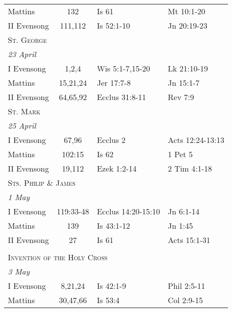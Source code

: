 \begin{longtable}{l c l l}
\hspace{1em} Mattins&132&Is 61&Mt 10:1-20\\
\hspace{1em} II Evensong&111,112&Is 52:1-10&Jn 20:19-23\\
\multicolumn{4}{l}{\textsc{St. George}}\\
\multicolumn{4}{l}{\textit{23 April}}\\
\hspace{1em} I Evensong&1,2,4&Wis 5:1-7,15-20&Lk 21:10-19\\
\hspace{1em} Mattins&15,21,24&Jer 17:7-8&Jn 15:1-7\\
\hspace{1em} II Evensong&64,65,92&Ecclus 31:8-11&Rev 7:9\\
\multicolumn{4}{l}{\textsc{St. Mark}}\\
\multicolumn{4}{l}{\textit{25 April}}\\
\hspace{1em} I Evensong&67,96&Ecclus 2&Acts 12:24-13:13\\
\hspace{1em} Mattins&102:15&Is 62&1 Pet 5\\
\hspace{1em} II Evensong&19,112&Ezek 1:2-14&2 Tim 4:1-18\\
\multicolumn{4}{l}{\textsc{Sts. Philip \& James}}\\
\multicolumn{4}{l}{\textit{1 May}}\\
\hspace{1em} I Evensong&119:33-48&Ecclus 14:20-15:10&Jn 6:1-14\\
\hspace{1em} Mattins&139&Is 43:1-12&Jn 1:45\\
\hspace{1em} II Evensong&27&Is 61&Acts 15:1-31\\
\\
\multicolumn{4}{l}{\textsc{Invention of the Holy Cross}}\\
\multicolumn{4}{l}{\textit{3 May}}\\
\hspace{1em} I Evensong&8,21,24&Is 42:1-9&Phil 2:5-11\\
\hspace{1em} Mattins&30,47,66&Is 53:4&Col 2:9-15\\

\end{longtable}

